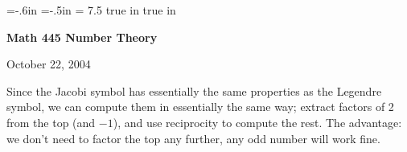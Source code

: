 \def\cmb{\MidnightBlue}	  %
\def\cnb{\NavyBlue}	  %
\def\crb{\RoyalBlue}	  %
\def\cce{\Cerulean}	  %
\def\ccy{\Cyan}		  %
\def\cpb{\ProcessBlue}	  %
\def\csb{\SkyBlue}	  %
\def\ctu{\Turquoise}	  %
\def\ctb{\TealBlue}	  %
\def\caq{\Aquamarine}	  %
\def\cbg{\BlueGreen}	  %
\def\cem{\Emerald}	  %
\def\cjg{\JungleGreen}	  %
\def\csg{\SeaGreen}	  %
\def\cgg{\Green}	  %
\def\cfg{\ForestGreen}	  %
\def\cpg{\PineGreen}	  %
\def\clg{\LimeGreen}	  %
\def\cyg{\YellowGreen}	  %
\def\cspg{\SpringGreen}	  %
\def\cog{\OliveGreen}	  %
\def\pars{\RawSienna}	  %
\def\cse{\Sepia}		  %
\def\cbr{\Brown}		  %
\def\cta{\Tan}		  %
\def\cgr{\Gray}		  %
\def\cbl{\Black}		  %
\def\cwh{\White}		  %


\voffset=-.6in
\hoffset=-.5in
\hsize = 7.5 true in
 true in


\overfullrule=0pt


\def\ctln{\centerline}
\def\u{\underbar}
\def\ssk{\smallskip}
\def\msk{\medskip}
\def\bsk{\bigskip}
\def\hsk{\hskip.1in}
\def\hhsk{\hskip.2in}

\def\lra{$\Leftrightarrow$ }


\ctln{\bf Math 445 Number Theory}

\smallskip

\ctln{October 22, 2004}

\medskip

Since the Jacobi symbol has essentially the same properties as
the Legendre symbol, we can compute them in essentially the same
way; extract factors of 2 from the top (and $-1$), and use reciprocity
to compute the rest. The advantage: we don't need to factor the top
any further, any odd number will work fine.

